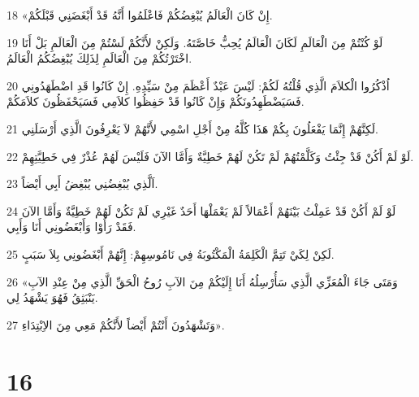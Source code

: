 \par 18 «إِنْ كَانَ الْعَالَمُ يُبْغِضُكُمْ فَاعْلَمُوا أَنَّهُ قَدْ أَبْغَضَنِي قَبْلَكُمْ.
\par 19 لَوْ كُنْتُمْ مِنَ الْعَالَمِ لَكَانَ الْعَالَمُ يُحِبُّ خَاصَّتَهُ. وَلَكِنْ لأَنَّكُمْ لَسْتُمْ مِنَ الْعَالَمِ بَلْ أَنَا اخْتَرْتُكُمْ مِنَ الْعَالَمِ لِذَلِكَ يُبْغِضُكُمُ الْعَالَمُ.
\par 20 اُذْكُرُوا الْكلاَمَ الَّذِي قُلْتُهُ لَكُمْ: لَيْسَ عَبْدٌ أَعْظَمَ مِنْ سَيِّدِهِ. إِنْ كَانُوا قَدِ اضْطَهَدُونِي فَسَيَضْطَهِدُونَكُمْ وَإِنْ كَانُوا قَدْ حَفِظُوا كلاَمِي فَسَيَحْفَظُونَ كلاَمَكُمْ.
\par 21 لَكِنَّهُمْ إِنَّمَا يَفْعَلُونَ بِكُمْ هَذَا كُلَّهُ مِنْ أَجْلِ اسْمِي لأَنَّهُمْ لاَ يَعْرِفُونَ الَّذِي أَرْسَلَنِي.
\par 22 لَوْ لَمْ أَكُنْ قَدْ جِئْتُ وَكَلَّمْتُهُمْ لَمْ تَكُنْ لَهُمْ خَطِيَّةٌ وَأَمَّا الآنَ فَلَيْسَ لَهُمْ عُذْرٌ فِي خَطِيَّتِهِمْ.
\par 23 اَلَّذِي يُبْغِضُنِي يُبْغِضُ أَبِي أَيْضاً.
\par 24 لَوْ لَمْ أَكُنْ قَدْ عَمِلْتُ بَيْنَهُمْ أَعْمَالاً لَمْ يَعْمَلْهَا أَحَدٌ غَيْرِي لَمْ تَكُنْ لَهُمْ خَطِيَّةٌ وَأَمَّا الآنَ فَقَدْ رَأَوْا وَأَبْغَضُونِي أَنَا وَأَبِي.
\par 25 لَكِنْ لِكَيْ تَتِمَّ الْكَلِمَةُ الْمَكْتُوبَةُ فِي نَامُوسِهِمْ: إِنَّهُمْ أَبْغَضُونِي بِلاَ سَبَبٍ.
\par 26 «وَمَتَى جَاءَ الْمُعَزِّي الَّذِي سَأُرْسِلُهُ أَنَا إِلَيْكُمْ مِنَ الآبِ رُوحُ الْحَقِّ الَّذِي مِنْ عِنْدِ الآبِ يَنْبَثِقُ فَهُوَ يَشْهَدُ لِي.
\par 27 وَتَشْهَدُونَ أَنْتُمْ أَيْضاً لأَنَّكُمْ مَعِي مِنَ الاِبْتِدَاءِ».

\chapter{16}

